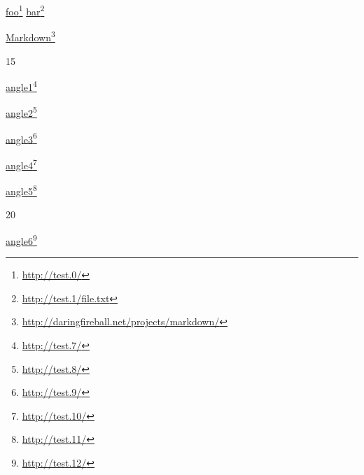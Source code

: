 \href{http://test.0/}{foo}\footnote{\href{http://test.0/}{http:\slash{}\slash{}test.0\slash{}}}
\href{http://test.1/file.txt}{bar}\footnote{\href{http://test.1/file.txt}{http:\slash{}\slash{}test.1\slash{}file.txt}}

\href{http://daringfireball.net/projects/markdown/}{Markdown}\footnote{\href{http://daringfireball.net/projects/markdown/}{http:\slash{}\slash{}daringfireball.net\slash{}projects\slash{}markdown\slash{}}}

15

\href{http://test.7/}{angle1}\footnote{\href{http://test.7/}{http:\slash{}\slash{}test.7\slash{}}}

\href{http://test.8/}{angle2}\footnote{\href{http://test.8/}{http:\slash{}\slash{}test.8\slash{}}}

\href{http://test.9/}{angle3}\footnote{\href{http://test.9/}{http:\slash{}\slash{}test.9\slash{}}}

\href{http://test.10/}{angle4}\footnote{\href{http://test.10/}{http:\slash{}\slash{}test.10\slash{}}}

\href{http://test.11/}{angle5}\footnote{\href{http://test.11/}{http:\slash{}\slash{}test.11\slash{}}}

20

\href{http://test.12/}{angle6}\footnote{\href{http://test.12/}{http:\slash{}\slash{}test.12\slash{}}}



